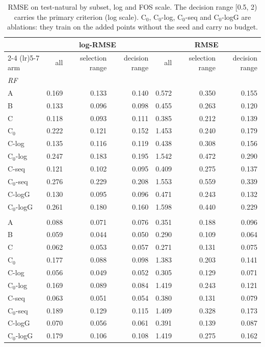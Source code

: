 \begin{table}[htbp]
\centering
\caption{RMSE on test-natural by subset, log and FOS scale. The decision range [0.5, 2) carries the primary criterion (log scale). C$_0$, C$_0$-log, C$_0$-seq and C$_0$-logG are ablations: they train on the added points without the seed and carry no budget.}
\label{tab:test-natural__log-rmse:subsets}
\begin{tabular}{lrrrrrr}
\toprule
 & \multicolumn{3}{c}{log-RMSE} & \multicolumn{3}{c}{RMSE} \\
\cmidrule(lr){2-4} \cmidrule(lr){5-7}
arm & all & selection range & decision range & all & selection range & decision range \\
\midrule
\multicolumn{7}{l}{\textit{RF}} \\
A & 0.169 & 0.133 & 0.140 & 0.572 & 0.350 & 0.155 \\
B & 0.133 & 0.096 & 0.098 & 0.455 & 0.263 & 0.120 \\
C & 0.118 & 0.093 & 0.111 & 0.385 & 0.212 & 0.139 \\
C$_0$ & 0.222 & 0.121 & 0.152 & 1.453 & 0.240 & 0.179 \\
C-log & 0.135 & 0.116 & 0.119 & 0.438 & 0.308 & 0.156 \\
C$_0$-log & 0.247 & 0.183 & 0.195 & 1.542 & 0.472 & 0.290 \\
C-seq & 0.121 & 0.102 & 0.095 & 0.409 & 0.275 & 0.137 \\
C$_0$-seq & 0.276 & 0.229 & 0.208 & 1.553 & 0.559 & 0.339 \\
C-logG & 0.130 & 0.095 & 0.096 & 0.471 & 0.243 & 0.132 \\
C$_0$-logG & 0.261 & 0.180 & 0.160 & 1.598 & 0.440 & 0.229 \\
\addlinespace
\multicolumn{7}{l}{\textit{GBM}} \\
A & 0.088 & 0.071 & 0.076 & 0.351 & 0.188 & 0.096 \\
B & 0.059 & 0.044 & 0.050 & 0.290 & 0.109 & 0.064 \\
C & 0.062 & 0.053 & 0.057 & 0.271 & 0.131 & 0.075 \\
C$_0$ & 0.177 & 0.088 & 0.098 & 1.383 & 0.203 & 0.141 \\
C-log & 0.056 & 0.049 & 0.052 & 0.305 & 0.129 & 0.071 \\
C$_0$-log & 0.169 & 0.089 & 0.084 & 1.419 & 0.243 & 0.121 \\
C-seq & 0.063 & 0.051 & 0.054 & 0.380 & 0.131 & 0.079 \\
C$_0$-seq & 0.189 & 0.129 & 0.115 & 1.409 & 0.328 & 0.173 \\
C-logG & 0.070 & 0.056 & 0.061 & 0.391 & 0.139 & 0.087 \\
C$_0$-logG & 0.179 & 0.106 & 0.108 & 1.419 & 0.275 & 0.162 \\
\bottomrule
\end{tabular}
\end{table}
